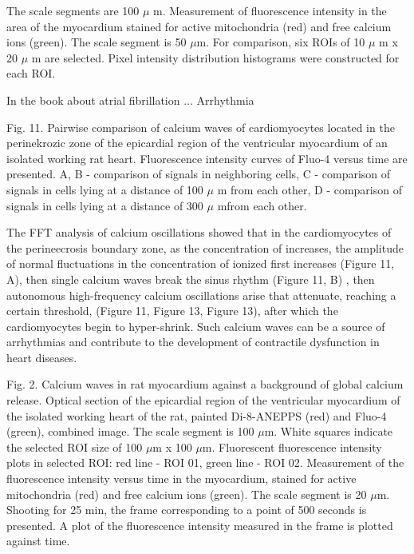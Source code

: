 \documentclass{biophys-new}
\begin{document}
The scale segments are 100 $\mu$ m.
Measurement of fluorescence intensity in the area of the myocardium stained for active mitochondria (red) and free calcium ions (green).
The scale segment is 50 $\mu$m.
For comparison, six ROIs of 10 $\mu$ m x 20 $\mu$ m are selected.
Pixel intensity distribution histograms were constructed for each ROI.


In the book \cite{kockskamper2002subcellular} about atrial fibrillation ...
Arrhythmia


Fig. 11. Pairwise comparison of calcium waves of cardiomyocytes located in the perinekrozic zone of the epicardial region of the ventricular myocardium of an isolated working rat heart. Fluorescence intensity curves of Fluo-4 versus time are presented. A, B - comparison of signals in neighboring cells, C - comparison of signals in cells lying at a distance of 100 $\mu$ m from each other, D - comparison of signals in cells lying at a distance of 300 $\mu$  mfrom each other.


The FFT analysis of calcium oscillations showed that in the cardiomyocytes of the perineecrosis boundary zone, as the concentration of  increases, the amplitude of normal fluctuations in the concentration of ionized  first increases (Figure 11, A), then single calcium waves break the sinus rhythm (Figure 11, B) , then autonomous high-frequency calcium oscillations arise that attenuate, reaching a certain threshold, (Figure 11, Figure 13, Figure 13), after which the cardiomyocytes begin to hyper-shrink. Such calcium waves can be a source of arrhythmias and contribute to the development of contractile dysfunction in heart diseases.


Fig. 2.  Calcium waves in rat myocardium against a background of global calcium release.
Optical section of the epicardial region of the ventricular myocardium of the isolated working heart of the rat, painted Di-8-ANEPPS (red) and Fluo-4 (green), combined image.
The scale segment is 100 $\mu$m.
White squares indicate the selected ROI size of 100 $\mu$m x 100 $\mu$m.
Fluorescent fluorescence intensity plots in selected ROI: red line - ROI 01, green line - ROI 02.
Measurement of the fluorescence intensity versus time in the myocardium, stained for active mitochondria (red) and free calcium ions (green).
The scale segment is 20 $\mu$m. Shooting for 25 min, the frame corresponding to a point of 500 seconds is presented.
A plot of the fluorescence intensity measured in the frame is plotted against time.
\end{document}
